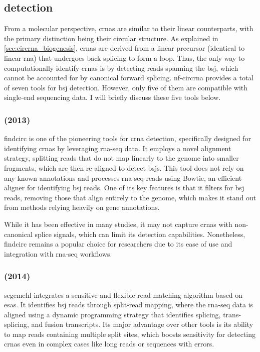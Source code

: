 \subsection{ detection}
\label{subsec:circrna_detection}
From a molecular perspective, \glspl{crna} are similar to their linear
counterparts, with the primary distinction being their circular structure.
As explained in \cref{sec:circrna_biogenesis}, \glspl{crna} are derived from a
linear precursor (identical to linear \gls{rna}) that undergoes back-splicing
to form a loop.
Thus, the only way to computationally identify \glspl{crna} is by detecting
reads spanning the \gls{bsj}, which cannot be accounted for by canonical
forward splicing.
\gls{nf-circrna} provides a total of seven tools for \gls{bsj}
detection.
However, only five of them are compatible with single-end sequencing data.
I will briefly discuss these five tools below.

\subsubsection{ (2013)}
\Gls{findcirc} is one of the pioneering tools for \gls{crna} detection,
specifically designed for identifying \glspl{crna} by leveraging \gls{rna-seq}
data.
It employs a novel alignment strategy, splitting reads that do not map linearly
to the genome into smaller fragments, which are then re-aligned to detect
\glspl{bsj}\supercite{memczak_circular_2013}.
This tool does not rely on any known annotations and processes \gls{rna-seq}
reads using Bowtie, an efficient aligner for identifying \gls{bsj} reads.
One of its key features is that it filters for \gls{bsj} reads, removing those
that align entirely to the genome, which makes it stand out from methods
relying heavily on gene annotations\supercite{memczak_circular_2013}.

While it has been effective in many studies, it may not capture \glspl{crna}
with non-canonical splice signals, which can limit its detection
capabilities\supercite{sekar_circular_2018,liu_prkra_2022}.
Nonetheless, \gls{findcirc} remains a popular choice for researchers due to its
ease of use and integration with \gls{rna-seq} workflows.

\subsubsection{ (2014)}
\Gls{segemehl} integrates a sensitive and flexible read-matching algorithm
based on \glspl{esa}.
It identifies \gls{bsj} reads through split-read mapping, where the
\gls{rna-seq} data is aligned using a dynamic programming strategy that
identifies splicing, trans-splicing, and fusion transcripts.
Its major advantage over other tools is its ability to map reads containing
multiple split sites, which boosts sensitivity for detecting \glspl{crna} even
in complex cases like long reads or sequences with
errors\supercite{hoffmann_multi-split_2014}.

